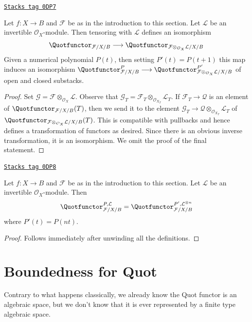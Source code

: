 \begin{lemma}
\label{moduli-lemma-quot-tensor-invertible}
\href{https://stacks.math.columbia.edu/tag/0DP7}{\texttt{Stacks tag 0DP7}}

Let $f : X \to B$ and $\mathcal{F}$ be as in the introduction to this section.
Let $\mathcal{L}$ be an invertible $\mathcal{O}_X$-module.
Then tensoring with $\mathcal{L}$ defines an isomorphism
$$
\Quotfunctor_{\mathcal{F}/X/B}
\longrightarrow
\Quotfunctor_{\mathcal{F} \otimes_{\mathcal{O}_X} \mathcal{L}/X/B}
$$
Given a numerical polynomial $P(t)$, then setting $P'(t) = P(t + 1)$
this map induces an isomorphism
$\Quotfunctor^P_{\mathcal{F}/X/B}
\longrightarrow
\Quotfunctor^{P'}_{\mathcal{F} \otimes_{\mathcal{O}_X} \mathcal{L}/X/B}$
of open and closed substacks.
\end{lemma}

\begin{proof}
Set $\mathcal{G} = \mathcal{F} \otimes_{\mathcal{O}_X} \mathcal{L}$.
Observe that
$\mathcal{G}_T = \mathcal{F}_T \otimes_{\mathcal{O}_{X_T}} \mathcal{L}_T$.
If $\mathcal{F}_T \to \mathcal{Q}$ is an element of
$\Quotfunctor_{\mathcal{F}/X/B}(T)$, then we send it
to the element
$\mathcal{G}_T \to \mathcal{Q} \otimes_{\mathcal{O}_{X_T}} \mathcal{L}_T$
of
$\Quotfunctor_{\mathcal{F} \otimes_{\mathcal{O}_X} \mathcal{L}/X/B}(T)$.
This is compatible with pullbacks and hence
defines a transformation of functors as desired.
Since there is an obvious inverse transformation,
it is an isomorphism. We omit the proof of the final statement.
\end{proof}

\begin{lemma}
\label{moduli-lemma-quot-power-invertible}
\href{https://stacks.math.columbia.edu/tag/0DP8}{\texttt{Stacks tag 0DP8}}

Let $f : X \to B$ and $\mathcal{F}$ be as in the introduction to this section.
Let $\mathcal{L}$ be an invertible $\mathcal{O}_X$-module.
Then
$$
\Quotfunctor^{P, \mathcal{L}}_{\mathcal{F}/X/B} =
\Quotfunctor^{P', \mathcal{L}^{\otimes n}}_{\mathcal{F}/X/B}
$$
where $P'(t) = P(nt)$.
\end{lemma}

\begin{proof}
Follows immediately after unwinding all the definitions.
\end{proof}

\section{Boundedness for Quot}
\label{moduli-section-quot-bounded}
Contrary to what happens classically, we already know the Quot
functor is an algebraic space, but we don't know that it is
ever represented by a finite type algebraic space.


